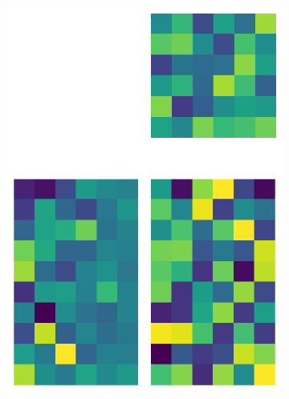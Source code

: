 \documentclass[10pt,twocolumn]{article}
\begin{document}
\begin{figure}[H]
\begin{subfigure}[t]{.15\textwidth}
\centering
\includegraphics[scale=.2]{random-matrix-reconstruction-PCs-6.png}
\caption{ }
\end{subfigure}
\begin{subfigure}[t]{.15\textwidth}
\centering

\end{subfigure}
\end{figure}
\end{document}
